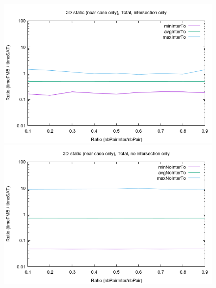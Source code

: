 \documentclass[12pt, a4paper]{article}
\begin{document}
\begin{center}
\begin{figure}[H]
\centering\includegraphics[width=12cm]{../Results/qualification3DinterNearCaseOnly.png}\\
\centering\includegraphics[width=12cm]{../Results/qualification3DnointerNearCaseOnly.png}\\
\end{figure}
\end{center}
\end{document}
